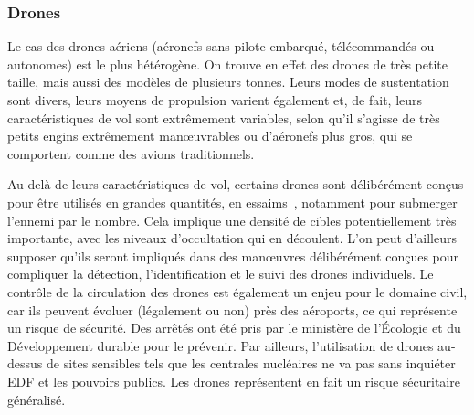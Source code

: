 	\subsubsection{Drones}
	Le cas des drones aériens (aéronefs sans pilote embarqué, télécommandés ou autonomes) est le plus hétérogène. On trouve en effet des drones de très petite taille, mais aussi des modèles de plusieurs tonnes.\footnotemark{} Leurs modes de sustentation sont divers, leurs moyens de propulsion varient également et, de fait, leurs caractéristiques de vol sont extrêmement variables, selon qu'il s'agisse de très petits engins extrêmement manœuvrables ou d'aéronefs plus gros, qui se comportent comme des avions traditionnels.

	
	Au-delà de leurs caractéristiques de vol, certains drones sont délibérément conçus pour être utilisés en grandes quantités, en essaims~\cite{alonso2016distributed, saska2014autonomous},\footnotemark{} notamment pour submerger l'ennemi par le nombre. Cela implique une densité de cibles potentiellement très importante, avec les niveaux d'occultation qui en découlent. L'on peut d'ailleurs supposer qu'ils seront impliqués dans des manœuvres délibérément conçues pour compliquer la détection, l'identification et le suivi des drones individuels. Le contrôle de la circulation des drones est également un enjeu pour le domaine civil, car ils peuvent évoluer (légalement ou non) près des aéroports, ce qui représente un risque de sécurité. Des arrêtés ont été pris par le ministère de l'Écologie et du Développement durable pour le prévenir.\footnotemark{} Par ailleurs, l'utilisation de drones au-dessus de sites sensibles tels que les centrales nucléaires ne va pas sans inquiéter EDF et les pouvoirs publics.\footnotemark{} Les drones représentent en fait un risque sécuritaire généralisé.\footnotemark{}

	\addtocounter{footnote}{-3}
	
	\addtocounter{footnote}{1}
	
